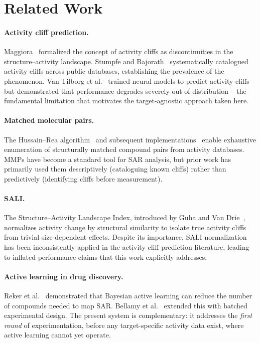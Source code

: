 \documentclass[sigconf, nonacm]{acmart}
\begin{document}
\section{Related Work}

\paragraph{Activity cliff prediction.} Maggiora~\cite{Maggiora2006} formalized the concept of activity cliffs as discontinuities in the structure--activity landscape. Stumpfe and Bajorath~\cite{Stumpfe2012} systematically catalogued activity cliffs across public databases, establishing the prevalence of the phenomenon. Van Tilborg et al.~\cite{vanTilborg2022} trained neural models to predict activity cliffs but demonstrated that performance degrades severely out-of-distribution -- the fundamental limitation that motivates the target-agnostic approach taken here.

\paragraph{Matched molecular pairs.} The Hussain--Rea algorithm~\cite{Hussain2010} and subsequent implementations~\cite{Dalke2018} enable exhaustive enumeration of structurally matched compound pairs from activity databases. MMPs have become a standard tool for SAR analysis, but prior work has primarily used them descriptively (cataloguing known cliffs) rather than predictively (identifying cliffs before measurement).

\paragraph{SALI.} The Structure--Activity Landscape Index, introduced by Guha and Van Drie~\cite{Guha2008}, normalizes activity change by structural similarity to isolate true activity cliffs from trivial size-dependent effects. Despite its importance, SALI normalization has been inconsistently applied in the activity cliff prediction literature, leading to inflated performance claims that this work explicitly addresses.

\paragraph{Active learning in drug discovery.} Reker et al.~\cite{Reker2015,Reker2020} demonstrated that Bayesian active learning can reduce the number of compounds needed to map SAR. Bellamy et al.~\cite{Bellamy2022} extended this with batched experimental design. The present system is complementary: it addresses the \textit{first round} of experimentation, before any target-specific activity data exist, where active learning cannot yet operate.
\end{document}
